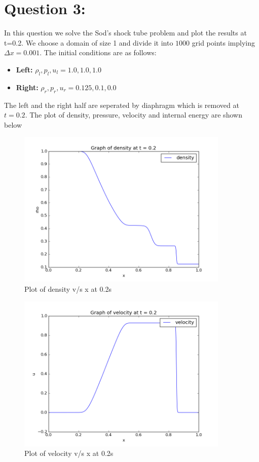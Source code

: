 \documentclass[11pt, a4paper]{article}
\begin{document}
\section{Question 3:}
In this question we solve the Sod's shock tube problem and plot the results at t=0.2. We choose a domain of size 1 and divide 
it into $1000$ grid points implying $\Delta x = 0.001$. The initial conditions are as follows:
\begin{itemize}
 \item \textbf{Left:} $\rho_l, p_l, u_l = 1.0, 1.0, 1.0$
 \item \textbf{Right:} $\rho_r, p_r, u_r = 0.125, 0.1, 0.0$
\end{itemize}
The left and the right half are seperated by diaphragm which is removed at $t = 0.2$. The plot of density, pressure, velocity
and internal energy are shown below

\begin{figure}[H]
 \centering
 \includegraphics[width = 0.9\textwidth]{Sh_tube_den.png}
 \caption{Plot of density v/s x at 0.2s}
\end{figure}

\begin{figure}[H]
 \centering
 \includegraphics[width = 0.9\textwidth]{Sh_tube_vel.png}
 \caption{Plot of velocity v/s x at 0.2s}
\end{figure}
\end{document}
